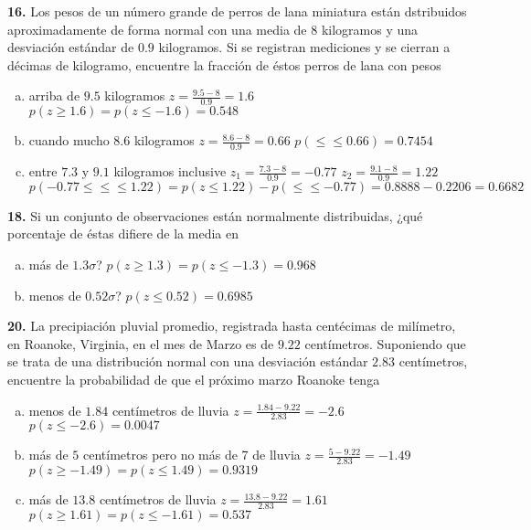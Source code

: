\documentclass[12pt, letterpaper]{article}
\begin{document}
    \textbf{16. }Los pesos de un número grande de perros de lana miniatura están dstribuidos aproximadamente de forma normal
    con una media de $8$ kilogramos y  una desviación estándar de $0.9$ kilogramos. Si se registran mediciones y se cierran
    a décimas de kilogramo, encuentre la fracción de éstos perros de lana con pesos
        \begin{enumerate}[a)]
            \item arriba de $9.5$ kilogramos\vskip0.5cm
                $z=\displaystyle\frac{9.5-8}{0.9}=1.6$\vskip0.5cm
                $p(z\geq 1.6)=p(z\leq -1.6)=0.548$
            \item cuando mucho $8.6$ kilogramos\vskip0.5cm
                $z=\displaystyle\frac{8.6-8}{0.9}=0.66$\vskip0.5cm
                $p(\leq \leq 0.66) = 0.7454$
            \item entre $7.3$ y $9.1$ kilogramos inclusive\vskip0.5cm
                $z_1=\displaystyle\frac{7.3-8}{0.9}=-0.77$\vskip0.5cm
                $z_2=\displaystyle\frac{9.1-8}{0.9}=1.22$\vskip0.5cm
                $p(-0.77\leq \leq \leq 1.22)=p(z\leq 1.22)-p(\leq \leq -0.77)=0.8888-0.2206=0.6682$
        \end{enumerate}\vskip1cm

    \textbf{18. }Si un conjunto de observaciones están normalmente distribuidas, ¿qué porcentaje de éstas difiere de la
    media en
        \begin{enumerate}[a)]
            \item más de $1.3\sigma$?\vskip0.5cm
                $p(z\geq 1.3)=p(z\leq -1.3)=0.968$
            \item menos de $0.52\sigma$?\vskip0.5cm
                $p(z\leq 0.52)=0.6985$
        \end{enumerate}\vskip1cm

    \textbf{20. }La precipiación pluvial promedio, registrada hasta centécimas de milímetro, en Roanoke, Virginia, en el
    mes de Marzo es de $9.22$ centímetros. Suponiendo que se trata de una distribución normal con una desviación estándar
    $2.83$ centímetros, encuentre la probabilidad de que el próximo marzo Roanoke tenga
        \begin{enumerate}[a)]
            \item menos de $1.84$ centímetros de lluvia\vskip0.5cm
                $z=\displaystyle\frac{1.84-9.22}{2.83}=-2.6$\vskip0.5cm
                $p(z\leq -2.6)=0.0047$
            \item más de $5$ centímetros pero no más de 7 de lluvia\vskip0.5cm
                $z=\displaystyle\frac{5-9.22}{2.83}=-1.49$\vskip0.5cm
                $p(z\geq -1.49)=p(z\leq 1.49)=0.9319$
            \item más de $13.8$ centímetros de lluvia\vskip0.5cm
                $z=\displaystyle\frac{13.8-9.22}{2.83}=1.61$\vskip0.5cm
                $p(z\geq 1.61)=p(z\leq -1.61)=0.537$
        \end{enumerate}\vskip1cm
\end{document}

